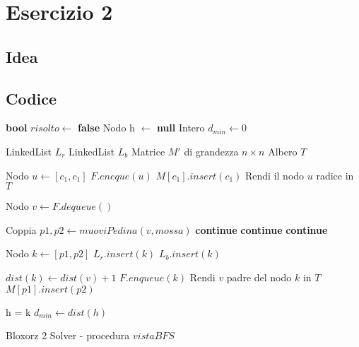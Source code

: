 \section*{Esercizio 2}

\subsection{Idea}

\subsection{Codice}
\begin{algorithm}[H]
\SetAlgoLined
{}


\textbf{bool} $risolto \gets$ \textbf{false} \;
Nodo h $\gets$ \textbf{null} \;
Intero $d_{min} \gets 0$

 {
    LinkedList $L_r$ \;
    LinkedList $L_b$ \;
    Matrice $M'$ di grandezza $n \times n$ \;
    Albero $T$ \;

    Nodo $u \gets [c_1, c_1]$ \;
    $F.eneque(u)$ \;
    $M[c_1].insert(c_1)$ \;
    Rendi il nodo $u$ radice in $T$ \;
     {
        Nodo $v \gets F.dequeue()$ \;
         {
            Coppia $p1,p2 \gets muoviPedina(v, mossa)$ \;
             {
                \textbf{continue} \;
            }
             {
                \textbf{continue} \;
            }
             {
                \textbf{continue} \;
            }

            Nodo $k \gets [p1, p2]$ \;
             {
                $L_r.insert(k)$ \;
            }
             {
                $L_b.insert(k)$ \;
            }

            $dist(k) \gets dist(v) + 1$ \;
            $F.enqueue(k)$\;
            Rendi $v$ padre del nodo $k$ in $T$ \;
            $M[p1].insert(p2)$ \;

             {
                h = k \;
                $d_{min} \gets dist(h)$
            }
        } 
    }

     \;
}

\caption{Bloxorz 2 Solver - procedura $vistaBFS$}
\end{algorithm}

